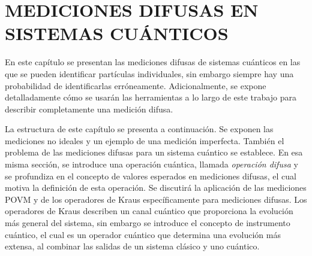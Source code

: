 \documentclass[12pt,oneside]{book}\raggedbottom{} %
\begin{document}
\begin{sloppypar}
{{\section{MEDICIONES DIFUSAS EN SISTEMAS CUÁNTICOS}
En este capítulo se presentan las mediciones difusas de sistemas cuánticos en
las que se pueden identificar partículas individuales, sin embargo siempre hay
una probabilidad de identificarlas erróneamente.  Adicionalmente, se expone
detalladamente cómo se usarán las herramientas a lo largo de este trabajo
para describir completamente una medición difusa.%

La estructura de este capítulo se presenta a continuación. Se exponen las
mediciones no ideales y un ejemplo de una medición imperfecta. También el
problema de las mediciones difusas para un sistema cuántico se establece. En
esa misma sección, se introduce una operación cuántica, llamada
\textit{operación difusa} y se profundiza en el concepto de valores esperados
en mediciones difusas, el cual motiva la definición de esta operación. Se
discutirá la aplicación de las mediciones POVM y de los operadores de Kraus
específicamente para mediciones difusas. Los operadores de Kraus describen un
canal cuántico que proporciona la evolución más general del sistema, sin
embargo se introduce el concepto de instrumento cuántico, el cual es un
operador cuántico que determina una evolución más extensa, al combinar las
salidas de un sistema clásico y uno cuántico.






}}
\end{sloppypar}
\end{document}
